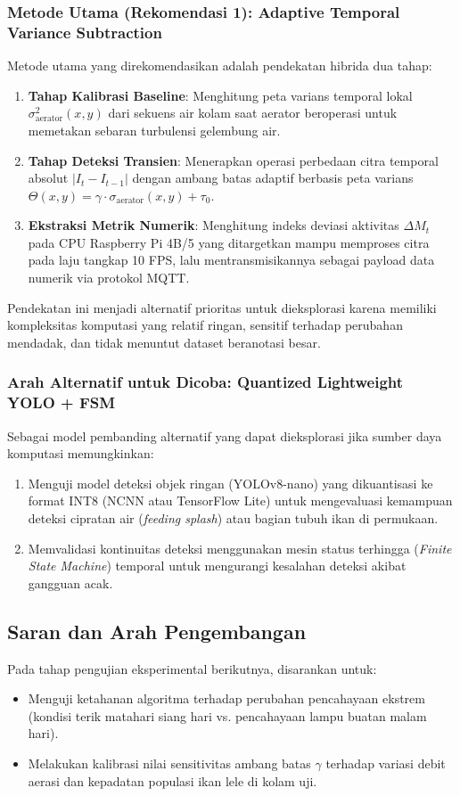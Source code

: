 \subsubsection{Metode Utama (Rekomendasi 1): Adaptive Temporal Variance Subtraction}
Metode utama yang direkomendasikan adalah pendekatan hibrida dua tahap:
\begin{enumerate}
    \item \textbf{Tahap Kalibrasi Baseline}: Menghitung peta varians temporal lokal $\sigma_{\text{aerator}}^2(x,y)$ dari sekuens air kolam saat aerator beroperasi untuk memetakan sebaran turbulensi gelembung air.
    \item \textbf{Tahap Deteksi Transien}: Menerapkan operasi perbedaan citra temporal absolut $|I_t - I_{t-1}|$ dengan ambang batas adaptif berbasis peta varians $\Theta(x,y) = \gamma \cdot \sigma_{\text{aerator}}(x,y) + \tau_0$.
    \item \textbf{Ekstraksi Metrik Numerik}: Menghitung indeks deviasi aktivitas $\Delta M_t$ pada CPU Raspberry Pi 4B/5 yang ditargetkan mampu memproses citra pada laju tangkap 10 FPS, lalu mentransmisikannya sebagai payload data numerik via protokol MQTT.
\end{enumerate}
Pendekatan ini menjadi alternatif prioritas untuk dieksplorasi karena memiliki kompleksitas komputasi yang relatif ringan, sensitif terhadap perubahan mendadak, dan tidak menuntut dataset beranotasi besar.

\subsubsection{Arah Alternatif untuk Dicoba: Quantized Lightweight YOLO + FSM}
Sebagai model pembanding alternatif yang dapat dieksplorasi jika sumber daya komputasi memungkinkan:
\begin{enumerate}
    \item Menguji model deteksi objek ringan (YOLOv8-nano) yang dikuantisasi ke format INT8 (NCNN atau TensorFlow Lite) untuk mengevaluasi kemampuan deteksi cipratan air (\textit{feeding splash}) atau bagian tubuh ikan di permukaan.
    \item Memvalidasi kontinuitas deteksi menggunakan mesin status terhingga (\textit{Finite State Machine}) temporal untuk mengurangi kesalahan deteksi akibat gangguan acak.
\end{enumerate}

\subsection{Saran dan Arah Pengembangan}
Pada tahap pengujian eksperimental berikutnya, disarankan untuk:
\begin{itemize}
    \item Menguji ketahanan algoritma terhadap perubahan pencahayaan ekstrem (kondisi terik matahari siang hari vs. pencahayaan lampu buatan malam hari).
    \item Melakukan kalibrasi nilai sensitivitas ambang batas $\gamma$ terhadap variasi debit aerasi dan kepadatan populasi ikan lele di kolam uji.
\end{itemize}
